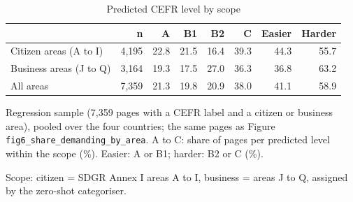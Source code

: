 \begin{table}[htbp]
\centering
\begin{threeparttable}
\caption{Predicted CEFR level by scope}
\label{tab:cefr-by-scope}
\begin{tabular}{lrrrrrrr}
\hline
 & n & A & B1 & B2 & C & Easier & Harder \\
\hline
Citizen areas (A to I) & 4,195 & 22.8 & 21.5 & 16.4 & 39.3 & 44.3 & 55.7 \\
Business areas (J to Q) & 3,164 & 19.3 & 17.5 & 27.0 & 36.3 & 36.8 & 63.2 \\
\hline
All areas & 7,359 & 21.3 & 19.8 & 20.9 & 38.0 & 41.1 & 58.9 \\
\hline
\end{tabular}
\begin{tablenotes}
\footnotesize
\item Regression sample (7,359 pages with a CEFR label and a citizen or business area), pooled over the four countries; the same pages as Figure \texttt{fig6\_share\_demanding\_by\_area}. A to C: share of pages per predicted level within the scope (\%). Easier: A or B1; harder: B2 or C (\%).
\item Scope: citizen = SDGR Annex I areas A to I, business = areas J to Q, assigned by the zero-shot categoriser.
\end{tablenotes}
\end{threeparttable}
\end{table}
